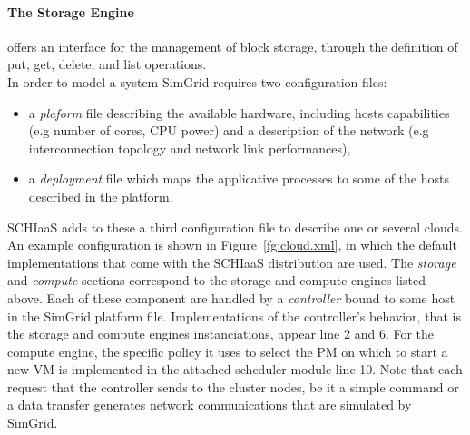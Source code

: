 \paragraph{The Storage  Engine}  offers  an interface  for  the  management of  block
  storage, through the definition of put, get, delete, and list operations.\\

In order to model a system SimGrid requires two configuration files: 
\begin{itemize}
\item a \emph{plaform}  file describing the available  hardware, including hosts
  capabilities (e.g number of cores, CPU power) and a description of the network
  (e.g interconnection topology and network link performances),
\item a \emph{deployment} file which maps the applicative processes to some of
  the hosts described in the platform.
\end{itemize}

SCHIaaS adds  to these  a third  configuration file to  describe one  or several
clouds.   An example  configuration  is shown  in Figure~\ref{fg:cloud.xml},  in
which the  default implementations that  come with the SCHIaaS  distribution are
used.  The \emph{storage} and \emph{compute}  sections correspond to the storage
and compute  engines listed  above.  Each  of these component  are handled  by a
\emph{controller}   bound  to   some  host   in  the   SimGrid  platform   file.
Implementations of  the controller's behavior,  that is the storage  and compute
engines  instanciations, appear  line  2 and  6.  For  the  compute engine,  the
specific  policy it  uses  to select  the  PM on  which  to start  a  new VM  is
implemented in  the attached scheduler module  line 10.  Note that  each request
that the controller sends to the cluster nodes, be it a simple command or a data
transfer generates network communications that are simulated by SimGrid.

